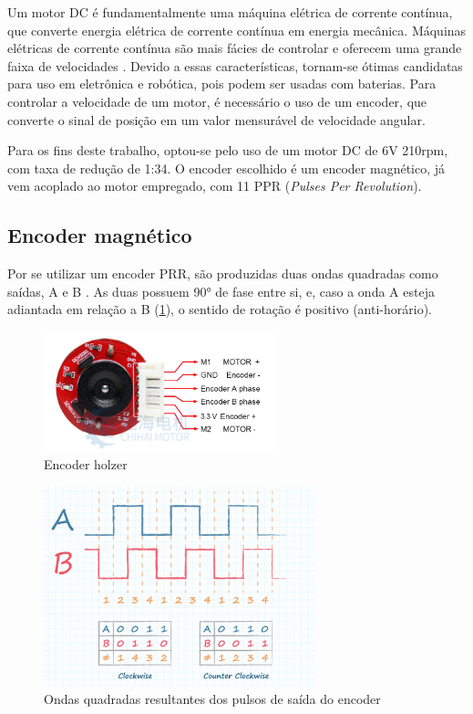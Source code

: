 
Um motor DC é fundamentalmente uma máquina elétrica de corrente contínua, que
converte energia elétrica de corrente contínua em energia mecânica. Máquinas
elétricas de corrente contínua são mais fácies de controlar e oferecem uma
grande faixa de velocidades \cite{Maquinas_eletricas}. Devido a essas
características, tornam-se ótimas candidatas para uso em eletrônica e robótica,
pois podem ser usadas com baterias. Para controlar a velocidade de um motor,
é necessário o uso de um encoder, que converte o sinal de posição em um valor
mensurável de velocidade angular.


Para os fins deste trabalho, optou-se pelo uso de um motor DC de 6V 210rpm, 
com taxa de redução de 1:34. O encoder escolhido é um encoder magnético, já
vem acoplado ao motor empregado, com 11 PPR (\textit{Pulses Per Revolution}).

\subsection{Encoder magnético}

Por se utilizar um encoder PRR, são produzidas duas ondas quadradas como saídas,
A e B \cite{encoder_ppr}. As duas possuem 90° de fase entre si, e, caso a onda A
esteja adiantada em relação a B (\ref{encoder_ppr_ab}), o sentido de rotação é
positivo (anti-horário).

\begin{figure}[h]
	\centering
	\includegraphics[width=0.6\textwidth]{figures/encoder_holzer}
	\caption{Encoder holzer \cite{encoder_holzer}}
\end{figure}

\begin{figure}[h]
	\centering
	\includegraphics[width=0.7\textwidth]{figures/encoder_pulso_ab}
	\caption{Ondas quadradas resultantes dos pulsos de saída do encoder \cite{encoder_ppr}}
	\label{encoder_ppr_ab}
\end{figure}


